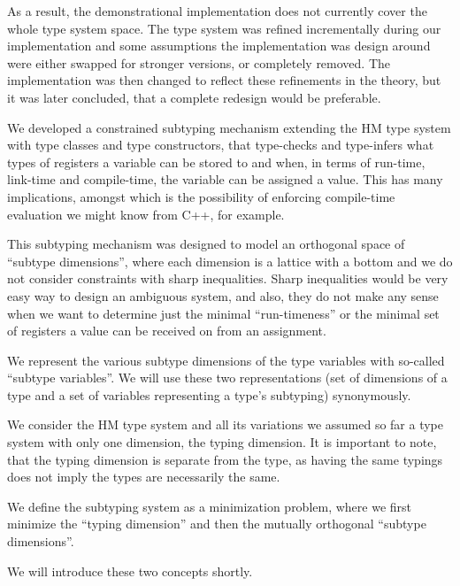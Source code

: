 As a result, the demonstrational implementation does not currently cover the whole type system space. The type system was refined incrementally during our implementation and some assumptions the implementation was design around were either swapped for stronger versions, or completely removed. The implementation was then changed to reflect these refinements in the theory, but it was later concluded, that a complete redesign would be preferable.

We developed a constrained subtyping mechanism extending the HM type system with type classes and type constructors, that type-checks and type-infers what types of registers a variable can be stored to and when, in terms of run-time, link-time and compile-time, the variable can be assigned a value. This has many implications, amongst which is the possibility of enforcing compile-time evaluation we might know from C++, for example.

This subtyping mechanism was designed to model an orthogonal space of ``subtype dimensions'', where each dimension is a lattice with a bottom and we do not consider constraints with sharp inequalities. Sharp inequalities would be very easy way to design an ambiguous system, and also, they do not make any sense when we want to determine just the minimal ``run-timeness'' or the minimal set of registers a value can be received on from an assignment.

We represent the various subtype dimensions of the type variables with so-called ``subtype variables''. We will use these two representations (set of dimensions of a type and a set of variables representing a type's subtyping) synonymously.

\begin{remark}
    We consider the HM type system and all its variations we assumed so far a type system with only one dimension, the typing dimension. It is important to note, that the typing dimension is separate from the type, as having the same typings does not imply the types are necessarily the same.
\end{remark}

\begin{defn}
    We define the subtyping system as a minimization problem, where we first minimize the ``typing dimension'' and then the mutually orthogonal ``subtype dimensions''.

    We will introduce these two concepts shortly.
\end{defn}


